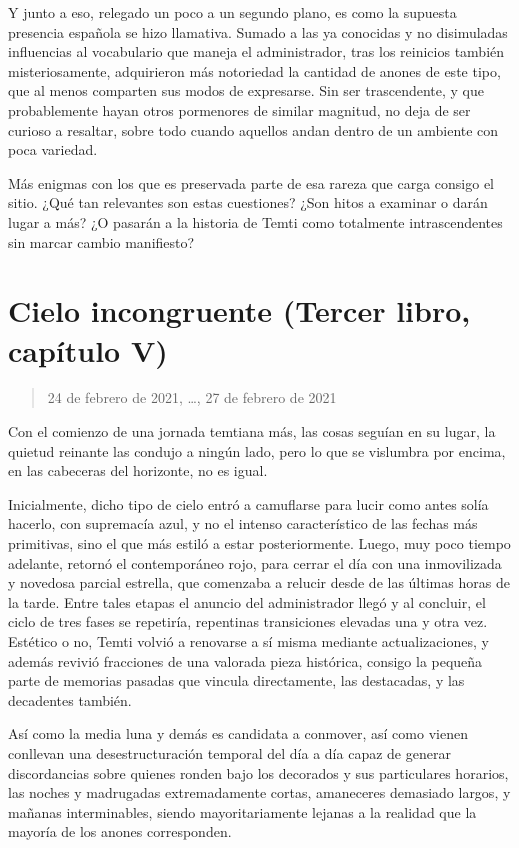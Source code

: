\documentclass[
]{book}
\begin{document}
Y junto a eso, relegado un poco a un segundo plano, es como la supuesta presencia española se hizo llamativa. Sumado a las ya conocidas y no disimuladas influencias al vocabulario que maneja el administrador, tras los reinicios también misteriosamente, adquirieron más notoriedad la cantidad de anones de este tipo, que al menos comparten sus modos de expresarse. Sin ser trascendente, y que probablemente hayan otros pormenores de similar magnitud, no deja de ser curioso a resaltar, sobre todo cuando aquellos andan dentro de un ambiente con poca variedad.

Más enigmas con los que es preservada parte de esa rareza que carga consigo el sitio. ¿Qué tan relevantes son estas cuestiones? ¿Son hitos a examinar o darán lugar a más? ¿O pasarán a la historia de Temti como totalmente intrascendentes sin marcar cambio manifiesto?

\hypertarget{cielo-incongruente-tercer-libro-capuxedtulo-v}{%
\section{Cielo incongruente (Tercer libro, capítulo V)}\label{cielo-incongruente-tercer-libro-capuxedtulo-v}}

\begin{quote}
24 de febrero de 2021, \ldots, 27 de febrero de 2021
\end{quote}

Con el comienzo de una jornada temtiana más, las cosas seguían en su lugar, la quietud reinante las condujo a ningún lado, pero lo que se vislumbra por encima, en las cabeceras del horizonte, no es igual.

Inicialmente, dicho tipo de cielo entró a camuflarse para lucir como antes solía hacerlo, con supremacía azul, y no el intenso característico de las fechas más primitivas, sino el que más estiló a estar posteriormente. Luego, muy poco tiempo adelante, retornó el contemporáneo rojo, para cerrar el día con una inmovilizada y novedosa parcial estrella, que comenzaba a relucir desde de las últimas horas de la tarde. Entre tales etapas el anuncio del administrador llegó y al concluir, el ciclo de tres fases se repetiría, repentinas transiciones elevadas una y otra vez. Estético o no, Temti volvió a renovarse a sí misma mediante actualizaciones, y además revivió fracciones de una valorada pieza histórica, consigo la pequeña parte de memorias pasadas que vincula directamente, las destacadas, y las decadentes también.

Así como la media luna y demás es candidata a conmover, así como vienen conllevan una desestructuración temporal del día a día capaz de generar discordancias sobre quienes ronden bajo los decorados y sus particulares horarios, las noches y madrugadas extremadamente cortas, amaneceres demasiado largos, y mañanas interminables, siendo mayoritariamente lejanas a la realidad que la mayoría de los anones corresponden.
\end{document}
